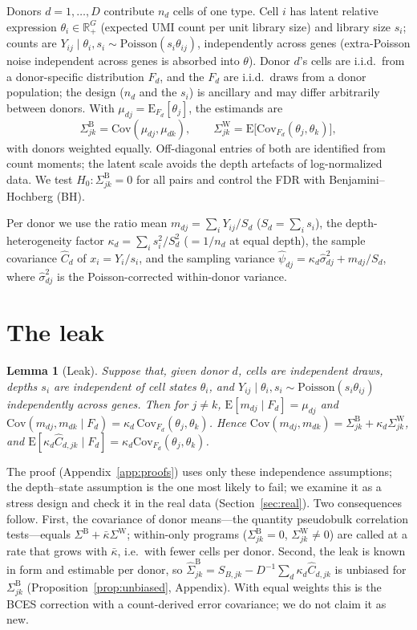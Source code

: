 \documentclass[10pt,letterpaper]{article}
\newtheorem{lemma}{Lemma}
\theoremstyle{definition}
\newcommand{\SB}{\Sigma^{\mathrm{B}}}
\newcommand{\SW}{\Sigma^{\mathrm{W}}}
\begin{document}
Donors $d=1,\dots,D$ contribute $n_d$ cells of one type. Cell $i$ has latent relative expression $\theta_i\in\mathbb{R}^G_+$ (expected UMI count per unit library size) and library size $s_i$; counts are $Y_{ij}\mid\theta_i,s_i\sim\mathrm{Poisson}(s_i\theta_{ij})$, independently across genes (extra-Poisson noise independent across genes is absorbed into $\theta$). Donor $d$'s cells are i.i.d.\ from a donor-specific distribution $F_d$, and the $F_d$ are i.i.d.\ draws from a donor population; the design ($n_d$ and the $s_i$) is ancillary and may differ arbitrarily between donors. With $\mu_{dj}=\mathrm{E}_{F_d}[\theta_j]$, the estimands are
\[
\SB_{jk}=\mathrm{Cov}(\mu_{dj},\mu_{dk}),\qquad \SW_{jk}=\mathrm{E}\big[\mathrm{Cov}_{F_d}(\theta_j,\theta_k)\big],
\]
with donors weighted equally. Off-diagonal entries of both are identified from count moments; the latent scale avoids the depth artefacts of log-normalized data. We test $H_0:\SB_{jk}=0$ for all pairs and control the FDR with Benjamini--Hochberg (BH).

Per donor we use the ratio mean $m_{dj}=\sum_iY_{ij}/S_d$ ($S_d=\sum_is_i$), the depth-heterogeneity factor $\kappa_d=\sum_is_i^2/S_d^2$ ($=1/n_d$ at equal depth), the sample covariance $\hat C_d$ of $x_i=Y_i/s_i$, and the sampling variance $\hat\psi_{dj}=\kappa_d\hat\sigma^2_{dj}+m_{dj}/S_d$, where $\hat\sigma^2_{dj}$ is the Poisson-corrected within-donor variance.

\section{The leak}

\begin{lemma}[Leak]\label{lem:leak}
Suppose that, given donor $d$, cells are independent draws, depths $s_i$ are independent of cell states $\theta_i$, and $Y_{ij}\mid\theta_i,s_i\sim\mathrm{Poisson}(s_i\theta_{ij})$ independently across genes. Then for $j\neq k$, $\mathrm{E}[m_{dj}\mid F_d]=\mu_{dj}$ and $\mathrm{Cov}(m_{dj},m_{dk}\mid F_d)=\kappa_d\,\mathrm{Cov}_{F_d}(\theta_j,\theta_k)$. Hence $\mathrm{Cov}(m_{dj},m_{dk})=\SB_{jk}+\kappa_d\SW_{jk}$, and $\mathrm{E}[\kappa_d\hat C_{d,jk}\mid F_d]=\kappa_d\mathrm{Cov}_{F_d}(\theta_j,\theta_k)$.
\end{lemma}
The proof (Appendix~\ref{app:proofs}) uses only these independence assumptions; the depth--state assumption is the one most likely to fail; we examine it as a stress design and check it in the real data (Section~\ref{sec:real}). Two consequences follow. First, the covariance of donor means---the quantity pseudobulk correlation tests---equals $\SB+\bar\kappa\SW$; within-only programs ($\SB_{jk}=0$, $\SW_{jk}\neq0$) are called at a rate that grows with $\bar\kappa$, i.e.\ with fewer cells per donor. Second, the leak is known in form and estimable per donor, so
$\hat\SB_{jk}=S_{B,jk}-D^{-1}\sum_d\kappa_d\hat C_{d,jk}$
is unbiased for $\SB_{jk}$ (Proposition~\ref{prop:unbiased}, Appendix). With equal weights this is the BCES correction \citep{AkritasBershady1996} with a count-derived error covariance; we do not claim it as new.
\end{document}
